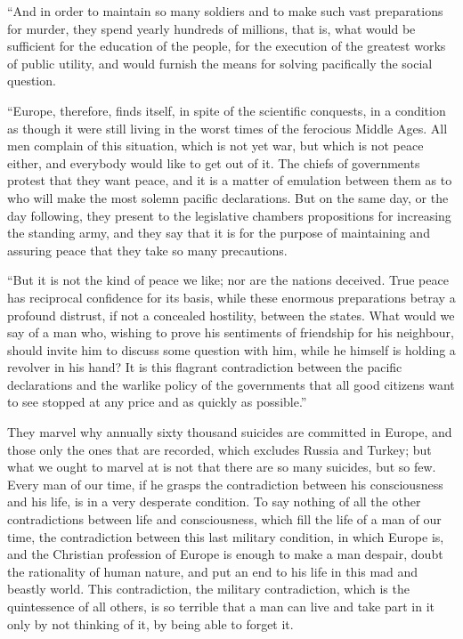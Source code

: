 \documentclass{book}
\begin{document}
“And in order to maintain so many soldiers and to make such vast preparations for murder, they spend yearly hundreds of millions, that is, what would be sufficient for the education of the people, for the execution of the greatest works of public utility, and would furnish the means for solving pacifically the social question.

“Europe, therefore, finds itself, in spite of the scientific conquests, in a condition as though it were still living in the worst times of the ferocious Middle Ages. All men complain of this situation, which is not yet war, but which is not peace either, and everybody would like to get out of it. The chiefs of governments protest that they want peace, and it is a matter of emulation between them as to who will make the most solemn pacific declarations. But on the same day, or the day following, they present to the legislative chambers propositions for increasing the standing army, and they say that it is for the purpose of maintaining and assuring peace that they take so many precautions.

“But it is not the kind of peace we like; nor are the nations deceived. True peace has reciprocal confidence for its basis, while these enormous preparations betray a profound distrust, if not a concealed hostility, between the states. What would we say of a man who, wishing to prove his sentiments of friendship for his neighbour, should invite him to discuss some question with him, while he himself is holding a revolver in his hand? It is this flagrant contradiction between the pacific declarations and the warlike policy of the governments that all good citizens want to see stopped at any price and as quickly as possible.”

They marvel why annually sixty thousand suicides are committed in Europe, and those only the ones that are recorded, which excludes Russia and Turkey; but what we ought to marvel at is not that there are so many suicides, but so few. Every man of our time, if he grasps the contradiction between his consciousness and his life, is in a very desperate condition. To say nothing of all the other contradictions between life and consciousness, which fill the life of a man of our time, the contradiction between this last military condition, in which Europe is, and the Christian profession of Europe is enough to make a man despair, doubt the rationality of human nature, and put an end to his life in this mad and beastly world. This contradiction, the military contradiction, which is the quintessence of all others, is so terrible that a man can live and take part in it only by not thinking of it, by being able to forget it.
\end{document}
